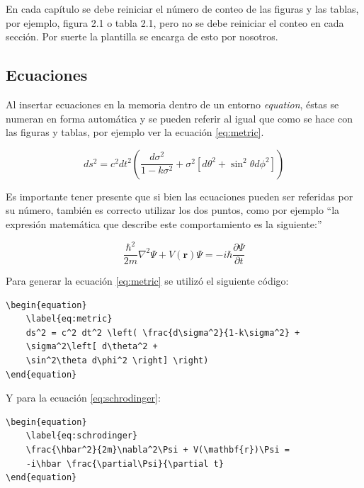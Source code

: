 En cada capítulo se debe reiniciar el número de conteo de las figuras y las tablas, por ejemplo, figura 2.1 o tabla 2.1, pero no se debe reiniciar el conteo en cada sección. Por suerte la plantilla se encarga de esto por nosotros.

\subsection{Ecuaciones}
\label{sec:Ecuaciones}

Al insertar ecuaciones en la memoria dentro de un entorno \textit{equation}, éstas se numeran en forma automática  y se pueden referir al igual que como se hace con las figuras y tablas, por ejemplo ver la ecuación \ref{eq:metric}.

\begin{equation}
	\label{eq:metric}
	ds^2 = c^2 dt^2 \left( \frac{d\sigma^2}{1-k\sigma^2} + \sigma^2\left[ d\theta^2 + \sin^2\theta d\phi^2 \right] \right)
\end{equation}
                                                        
Es importante tener presente que si bien las ecuaciones pueden ser referidas por su número, también es correcto utilizar los dos puntos, como por ejemplo ``la expresión matemática que describe este comportamiento es la siguiente:''

\begin{equation}
	\label{eq:schrodinger}
	\frac{\hbar^2}{2m}\nabla^2\Psi + V(\mathbf{r})\Psi = -i\hbar \frac{\partial\Psi}{\partial t}
\end{equation}

Para generar la ecuación \ref{eq:metric} se utilizó el siguiente código:

\begin{verbatim}
\begin{equation}
	\label{eq:metric}
	ds^2 = c^2 dt^2 \left( \frac{d\sigma^2}{1-k\sigma^2} + 
	\sigma^2\left[ d\theta^2 + 
	\sin^2\theta d\phi^2 \right] \right)
\end{equation}
\end{verbatim}

Y para la ecuación \ref{eq:schrodinger}:

\begin{verbatim}
\begin{equation}
	\label{eq:schrodinger}
	\frac{\hbar^2}{2m}\nabla^2\Psi + V(\mathbf{r})\Psi = 
	-i\hbar \frac{\partial\Psi}{\partial t}
\end{equation}

\end{verbatim}